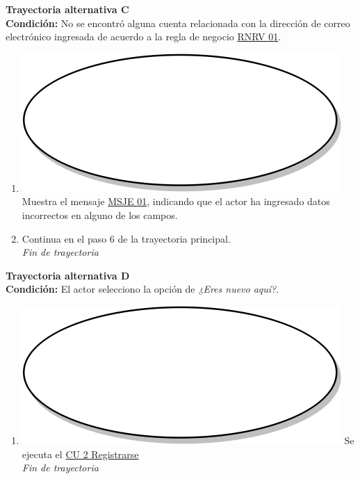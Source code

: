 \textbf{Trayectoria alternativa C} \label{cu1_1_ta_c}\\
\textbf{Condición:} No se encontró alguna cuenta relacionada con la dirección de correo electrónico ingresada de acuerdo a la regla de negocio \hyperref[rnrv_01]{RNRV 01}.\\
 \begin{enumerate}[label=C\arabic*]
    \item {\includegraphics[scale=.05]{Capitulo3/img/proceso.png} Muestra el mensaje \hyperref[msje_01]{MSJE 01}, indicando que el actor ha ingresado datos incorrectos en alguno de los campos.}
    \item {Continua en el paso 6 de la trayectoria principal.} \\
    \textit{Fin de trayectoria} \\
\end{enumerate}

\textbf{Trayectoria alternativa D} \label{cu1_1_ta_d}\\
\textbf{Condición:} El actor selecciono la opción de \textit{¿Eres nuevo aquí?}.\\
 \begin{enumerate}[label=D\arabic*]
    \item {\includegraphics[scale=.05]{Capitulo3/img/proceso.png} Se ejecuta el \hyperref[cu2]{CU 2 Registrarse}} \\
    \textit{Fin de trayectoria} \\
\end{enumerate}

